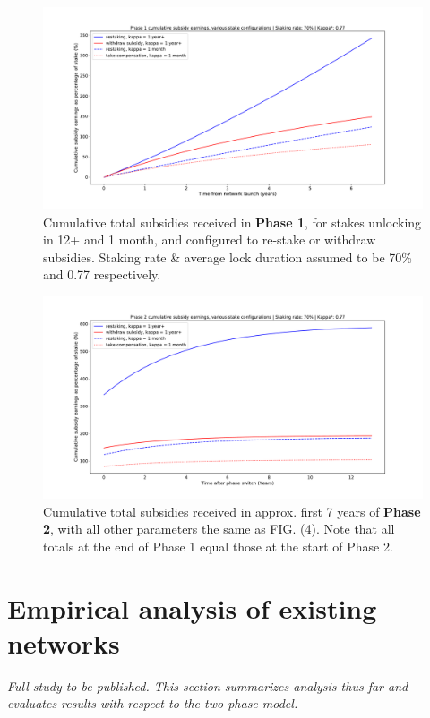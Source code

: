 \documentclass[longbibliography,nofootinbib]{revtex4-1}
\begin{document}
\begin{figure}[h!]
    \includegraphics[width=\textwidth]{graphs/SubsidyP1.pdf}
    \caption{Cumulative total subsidies received in \textbf{Phase 1}, for stakes unlocking in 12+ and 1 month, and configured to re-stake or withdraw subsidies. Staking rate \& average lock duration assumed to be 70\% and 0.77 respectively.}
    \label{fig:tp}
\end{figure}

\begin{figure}[h!]
    \includegraphics[width=\textwidth]{graphs/SubsidyP2.pdf}
    \caption{Cumulative total subsidies received in approx. first 7 years of \textbf{Phase 2}, with all other parameters the same as FIG. (4). Note that all totals at the end of Phase 1 equal those at the start of Phase 2.}
    \label{fig:tp}
\end{figure}

\section{Empirical analysis of existing networks}

\textit{Full study to be published. This section summarizes analysis thus far and evaluates results with respect to the two-phase model.}
\end{document}
